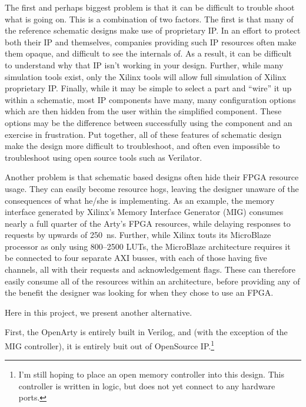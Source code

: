 \documentclass{gqtekspec}
\begin{document}
The first and perhaps biggest problem is that it can be difficult to trouble
shoot what is going on.  This is a combination of two factors.  The first is
that many of the reference schematic designs make use of proprietary IP.  In
an effort to protect both their IP and themselves, companies providing such
IP resources often make them opaque, and difficult to see the internals of.
As a result, it can be difficult to understand why that IP isn't working in
your design.  Further, while many simulation tools exist, only the Xilinx tools
will allow full simulation of Xilinx proprietary IP.  Finally, while it may be
simple to select a part and ``wire'' it up within a schematic, most IP
components have many, many configuration options which are then hidden from the
user within the simplified component.  These options may be the difference
between successfully using the component and an exercise in frustration.  
Put together, all of these features of schematic design make the design more
difficult to troubleshoot, and often even impossible to troubleshoot using
open source tools such as Verilator.

Another problem is that schematic based designs often hide their FPGA resource
usage.  They can easily become resource hogs, leaving the designer unaware
of the consequences of what he/she is implementing.  As an example, the memory
interface generated by Xilinx's Memory Interface Generator (MIG) consumes
nearly a full quarter of the Arty's FPGA resources, while delaying responses
to requests by upwards of 250~ns.  Further, while Xilinx touts its MicroBlaze
processor as only using 800--2500 LUTs, the MicroBlaze architecture requires
it be connected to four separate AXI busses, with each of those having
five channels, all with their requests and acknowledgement flags.  These
can therefore easily consume all of the resources within an architecture, before
providing any of the benefit the designer was looking for when they chose to
use an FPGA.


%
%

Here in this project, we present another alternative.

First, the OpenArty is entirely built in Verilog, and (with the exception of
the MIG controller), it is entirely buit out of OpenSource IP.\footnote{I'm
still hoping to place an open memory controller into this design.  This
controller is written in logic, but does not yet connect to any hardware ports.}
\end{document}
